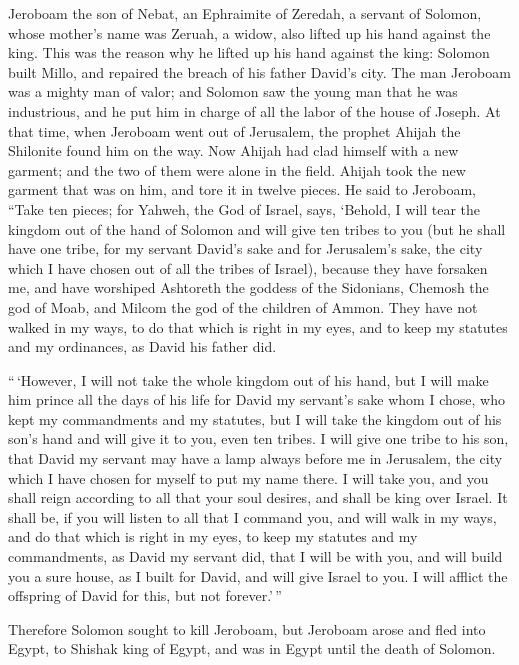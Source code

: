  Jeroboam the son of Nebat, an Ephraimite of Zeredah, a
servant of Solomon, whose mother's name was Zeruah, a widow, also lifted
up his hand against the king.  This was the reason why he
lifted up his hand against the king: Solomon built Millo, and repaired
the breach of his father David's city.  The man Jeroboam
was a mighty man of valor; and Solomon saw the young man that he was
industrious, and he put him in charge of all the labor of the house of
Joseph.  At that time, when Jeroboam went out of
Jerusalem, the prophet Ahijah the Shilonite found him on the way. Now
Ahijah had clad himself with a new garment; and the two of them were
alone in the field.  Ahijah took the new garment that was
on him, and tore it in twelve pieces.  He said to
Jeroboam, ``Take ten pieces; for Yahweh, the God of Israel, says,
`Behold, I will tear the kingdom out of the hand of Solomon and will
give ten tribes to you  (but he shall have one tribe, for
my servant David's sake and for Jerusalem's sake, the city which I have
chosen out of all the tribes of Israel),  because they
have forsaken me, and have worshiped Ashtoreth the goddess of the
Sidonians, Chemosh the god of Moab, and Milcom the god of the children
of Ammon. They have not walked in my ways, to do that which is right in
my eyes, and to keep my statutes and my ordinances, as David his father
did.

 ``\,`However, I will not take the whole kingdom out of
his hand, but I will make him prince all the days of his life for David
my servant's sake whom I chose, who kept my commandments and my
statutes,  but I will take the kingdom out of his son's
hand and will give it to you, even ten tribes.  I will
give one tribe to his son, that David my servant may have a lamp always
before me in Jerusalem, the city which I have chosen for myself to put
my name there.  I will take you, and you shall reign
according to all that your soul desires, and shall be king over Israel.
 It shall be, if you will listen to all that I command
you, and will walk in my ways, and do that which is right in my eyes, to
keep my statutes and my commandments, as David my servant did, that I
will be with you, and will build you a sure house, as I built for David,
and will give Israel to you.  I will afflict the
offspring of David for this, but not forever.'\,''

 Therefore Solomon sought to kill Jeroboam, but Jeroboam
arose and fled into Egypt, to Shishak king of Egypt, and was in Egypt
until the death of Solomon.

